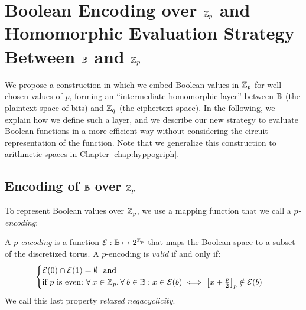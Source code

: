 \section{Boolean Encoding over $\mathbb{Z}_p$ and Homomorphic Evaluation Strategy Between $\mathbb{B}$ and $\mathbb{Z}_p$}
\label{sec:p_encodings_homorphic_layer}



We propose a construction in which we embed Boolean values in $\mathbb{Z}_p$ for well-chosen values of $p$, forming an ``intermediate homomorphic layer'' between $\mathbb{B}$ (the plaintext space of bits) and $\mathbb{Z}_q$ (the ciphertext space). In the following, we explain how we define such a layer, and we describe our new strategy to evaluate Boolean functions in a more efficient way without considering the circuit representation of the function. Note that we generalize this construction to arithmetic spaces in Chapter \ref{chap:hyppogriph}.


\subsection{Encoding of $\mathbb{B}$ over $\mathbb{Z}_p$}

To represent Boolean values over $\mathbb{Z}_p$, we use a mapping function that we call a \emph{$p$-encoding}:

\begin{definition}[$p$-encoding]
    A \emph{$p$-encoding} is a function $\mathcal{E}: \mathbb{B} \mapsto 2^{\mathbb{Z}_p}$ that maps the Boolean space to a subset of the discretized torus. A $p$-encoding is \emph{valid} if and only if:
    \begin{equation}
        \begin{cases}
            \mathcal{E}(0) \cap \mathcal{E}(1) = \emptyset~\text{ and}\\
            \text{if $p$ is even:} ~\forall \:x \in \mathbb Z_p, \forall \:b \in \mathbb{B}: x \in \mathcal{E}(b) \iff \left [ x + \frac p 2 \right ]_p \notin \mathcal{E}(b)
        \end{cases}
    \label{def:validity}
    \end{equation}
    We call this last property \emph{relaxed negacyclicity}.
    \label{def:p_encodings_encoding}
\end{definition}



